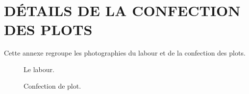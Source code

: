\chapter{DÉTAILS DE LA CONFECTION DES PLOTS}
\label{ann:plots}

Cette annexe regroupe les photographies du labour et de la confection des plots.

\begin{figure}[H]
    \centering
    \caption{Le labour. }
    \label{fig:labour2}
\end{figure}

\begin{figure}[H]
    \centering
    \caption{Confection de plot. }
    \label{fig:confection2}
\end{figure}
